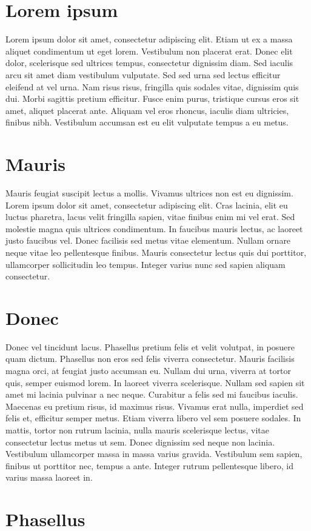 \section{Lorem ipsum}
Lorem ipsum dolor sit amet, consectetur adipiscing elit. Etiam ut ex a
massa aliquet condimentum ut eget lorem. Vestibulum non placerat erat.
Donec elit dolor, scelerisque sed ultrices tempus, consectetur dignissim
diam. Sed iaculis arcu sit amet diam vestibulum vulputate. Sed sed urna
sed lectus efficitur eleifend at vel urna. Nam risus risus, fringilla quis
sodales vitae, dignissim quis dui. Morbi sagittis pretium efficitur. Fusce
enim purus, tristique cursus eros sit amet, aliquet placerat ante. Aliquam
vel eros rhoncus, iaculis diam ultricies, finibus nibh. Vestibulum
accumsan est eu elit vulputate tempus a eu metus.

\section{Mauris}
Mauris feugiat suscipit lectus a mollis. Vivamus ultrices non est eu
dignissim. Lorem ipsum dolor sit amet, consectetur adipiscing elit. Cras
lacinia, elit eu luctus pharetra, lacus velit fringilla sapien, vitae
finibus enim mi vel erat. Sed molestie magna quis ultrices condimentum. In
faucibus mauris lectus, ac laoreet justo faucibus vel. Donec facilisis sed
metus vitae elementum. Nullam ornare neque vitae leo pellentesque finibus.
Mauris consectetur lectus quis dui porttitor, ullamcorper sollicitudin leo
tempus. Integer varius nunc sed sapien aliquam consectetur.

\section{Donec}
Donec vel tincidunt lacus. Phasellus pretium felis et velit volutpat, in
posuere quam dictum. Phasellus non eros sed felis viverra consectetur.
Mauris facilisis magna orci, at feugiat justo accumsan eu. Nullam dui
urna, viverra at tortor quis, semper euismod lorem. In laoreet viverra
scelerisque. Nullam sed sapien sit amet mi lacinia pulvinar a nec neque.
Curabitur a felis sed mi faucibus iaculis. Maecenas eu pretium risus, id
maximus risus. Vivamus erat nulla, imperdiet sed felis et, efficitur
semper metus. Etiam viverra libero vel sem posuere sodales. In mattis,
tortor non rutrum lacinia, nulla mauris scelerisque lectus, vitae
consectetur lectus metus ut sem. Donec dignissim sed neque non lacinia.
Vestibulum ullamcorper massa in massa varius gravida. Vestibulum sem
sapien, finibus ut porttitor nec, tempus a ante. Integer rutrum
pellentesque libero, id varius massa laoreet in.

\section{Phasellus}


